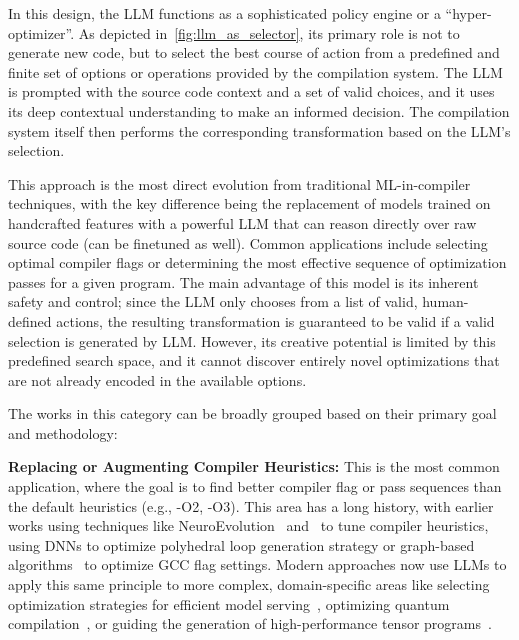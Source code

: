 \documentclass[pdflatex,sn-mathphys-ay,twocolumn, a4paper]{sn-jnl}%
\theoremstyle{thmstyleone}%
\theoremstyle{thmstyletwo}%
\theoremstyle{thmstylethree}%
\begin{document}
In this design, the LLM functions as a sophisticated policy engine or a ``hyper-optimizer''. As depicted in~\autoref{fig:llm_as_selector}, its primary role is not to generate new code, but to select the best course of action from a predefined and finite set of options or operations provided by the compilation system. The LLM is prompted with the source code context and a set of valid choices, and it uses its deep contextual understanding to make an informed decision. The compilation system itself then performs the corresponding transformation based on the LLM's selection.

This approach is the most direct evolution from traditional ML-in-compiler techniques, with the key difference being the replacement of models trained on handcrafted features with a powerful LLM that can reason directly over raw source code (can be finetuned as well). Common applications include selecting optimal compiler flags or determining the most effective sequence of optimization passes for a given program. The main advantage of this model is its inherent safety and control; since the LLM only chooses from a list of valid, human-defined actions, the resulting transformation is guaranteed to be valid if a valid selection is generated by LLM. However, its creative potential is limited by this predefined search space, and it cannot discover entirely novel optimizations that are not already encoded in the available options.

The works in this category can be broadly grouped based on their primary goal and methodology:

\textbf{Replacing or Augmenting Compiler Heuristics:} This is the most common application, where the goal is to find better compiler flag or pass sequences than the default heuristics (e.g., -O2, -O3). This area has a long history, with earlier works using techniques like NeuroEvolution~\citep{127_neuroevolutionary2023_gecco} and~\citet{40_mammadli2020static_llvmhpc} to tune compiler heuristics,~\citet{162_tavarageri2021poly_arxiv} using DNNs to optimize polyhedral loop generation strategy or graph-based algorithms~\citep{125_graphbased2024_hpec} to optimize GCC flag settings. Modern approaches now use LLMs to apply this same principle to more complex, domain-specific areas like selecting optimization strategies for efficient model serving~\citep{4_tang2025compiler_arxiv}, optimizing quantum compilation~\citep{89_quantum2024_dac}, or guiding the generation of high-performance tensor programs~\citep{167_zhai2024_osdi}.
\end{document}
